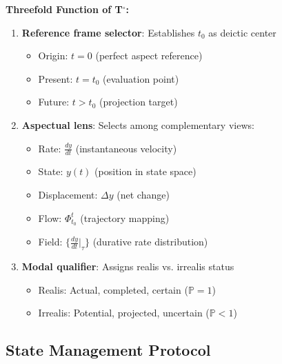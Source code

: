 \documentclass[11pt]{article}
\theoremstyle{defstyle}
\theoremstyle{mapstyle}
\newenvironment{theorembox}
{\begin{tcolorbox}[
  enhanced,
  enforce breakable,
  colback=defbox,
  colframe=theoremgreen!60,
  boxrule=1pt,
  arc=4pt,
  left=8pt,right=8pt,top=8pt,bottom=8pt,
  before skip=10pt,after skip=10pt
]}
{\end{tcolorbox}}
\begin{document}
\begin{theorembox}
\textbf{Threefold Function of T$^\circ$:}

\begin{enumerate}
\item \textbf{Reference frame selector}: Establishes $t_0$ as deictic center
    \begin{itemize}
    \item Origin: $t=0$ (perfect aspect reference)
    \item Present: $t=t_0$ (evaluation point)
    \item Future: $t>t_0$ (projection target)
    \end{itemize}
    
\item \textbf{Aspectual lens}: Selects among complementary views:
    \begin{itemize}
    \item Rate: $\frac{dy}{dt}$ (instantaneous velocity)
    \item State: $y(t)$ (position in state space)
    \item Displacement: $\Delta y$ (net change)
    \item Flow: $\Phi_{t_0}^t$ (trajectory mapping)
    \item Field: $\{\frac{dy}{dt}|_\tau\}$ (durative rate distribution)
    \end{itemize}
    
\item \textbf{Modal qualifier}: Assigns realis vs. irrealis status
    \begin{itemize}
    \item Realis: Actual, completed, certain ($\mathbb{P}=1$)
    \item Irrealis: Potential, projected, uncertain ($\mathbb{P}<1$)
    \end{itemize}
\end{enumerate}
\end{theorembox}

\subsection{State Management Protocol}
\end{document}
